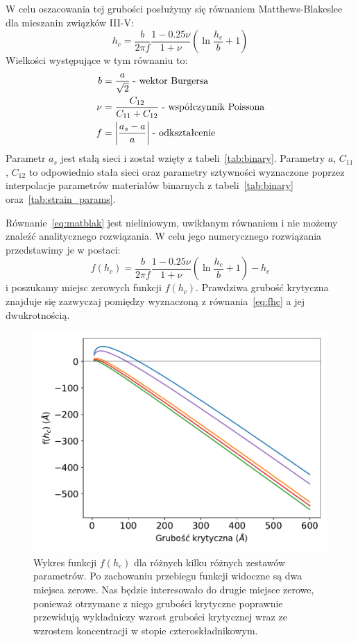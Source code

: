 \documentclass[12pt,openany,a4paper]{book}
\begin{document}
W celu oszacowania tej grubości posłużymy się równaniem Matthews-Blakeslee dla mieszanin
związków III-V:
\begin{equation}
	h_c = \frac{b}{2\pi f} \frac{1-0.25\nu}{1+\nu}\left( \ln{\frac{h_c}{b} +1}\right)
\label{eq:matblak}
\end{equation}
Wielkości występujące w tym równaniu to:
\begin{align*}
	b &= \frac{a}{\sqrt{2}} \;\text{- wektor Burgersa}\\
	\nu &= \frac{C_{12}}{C_{11}+C_{12}} \;\text{- współczynnik Poissona}\\
	f &= \abs{\frac{a_s-a}{a}} \; \text{- odkształcenie}
\end{align*}
Parametr \(a_s\) jest stałą sieci  i został wzięty z tabeli~\ref{tab:binary}.
Parametry \(a\), \(C_{11}\), \(C_{12}\) to odpowiednio stała sieci oraz parametry sztywności
 wyznaczone poprzez interpolacje parametrów materiałów
binarnych z tabeli~\ref{tab:binary} oraz~\ref{tab:strain_params}.

Równanie~\ref{eq:matblak} jest nieliniowym, uwikłanym równaniem i nie możemy znaleźć analitycznego
rozwiązania. W celu jego numerycznego rozwiązania przedstawimy je w postaci:
\begin{equation}
	f(h_c) = \frac{b}{2\pi f} \frac{1-0.25\nu}{1+\nu}\left( \ln{\frac{h_c}{b} +1}\right) - h_c
	\label{eq:fhc}
\end{equation}
i poszukamy miejsc zerowych funkcji \(f(h_c)\). Prawdziwa grubość krytyczna znajduje się zazwyczaj
pomiędzy wyznaczoną z równania~\ref{eq:fhc} a jej dwukrotnością.

\begin{figure}[htbp]
	\centering
	\includegraphics[width = 0.8\linewidth]{Figures/thickness/fhc.pdf}
	\caption{Wykres funkcji \(f(h_c)\) dla różnych kilku różnych zestawów parametrów.
	Po zachowaniu przebiegu funkcji widoczne są dwa miejsca zerowe. Nas będzie interesowało do drugie miejsce
	zerowe, ponieważ otrzymane z niego grubości krytyczne poprawnie przewidują wykładniczy wzrost grubości krytycznej
	wraz ze wzrostem koncentracji  w stopie czteroskładnikowym.}
	\label{fig:fhc}
\end{figure}
\end{document}
